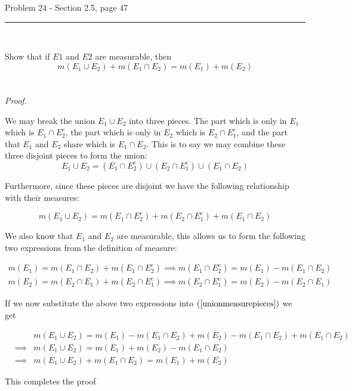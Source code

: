 \documentclass[11pt,reqno]{article}
\begin{document}
\begin{flushleft} 
Problem 24 - Section 2.5, page 47\\
\rule{500pt}{1pt}\\
\end{flushleft} 

Show that if $E1$ and $E2$ are measurable, then
\[ m(E_1 \cup E_2) + m(E_1 \cap E_2) = m(E_1) + m(E_2) \]
\\\\ \emph{Proof.}

We may break the union $E_1 \cup E_2$ into three pieces. The part which is only in $E_1$ which is $E_1 \cap E_2^c$, the part which is only in $E_2$ which is $E_2 \cap E_1^c$, and the part that $E_1$ and $E_2$ share which is $E_1 \cap E_2$. This is to say we may combine these three disjoint pieces to form the union:
\[ E_1 \cup E_2 = (E_1 \cap E_2^c) \cup  (E_2 \cap E_1^c) \cup (E_1 \cap E_2) \]

\noindent Furthermore, since these pieces are disjoint we have the following relationship with their measures:

\begin{equation} 
m(E_1 \cup E_2) = m(E_1 \cap E_2^c) +  m(E_2 \cap E_1^c) + m(E_1 \cap E_2) \label{unionmeasurepieces} 
\end{equation}

We also know that $E_1$ and $E_2$ are measurable, this allows us to form the following two expressions from the definition of measure:

\begin{eqnarray*}
m(E_1) =  m(E_1 \cap E_2) + m(E_1 \cap E_2^c) \implies  m(E_1 \cap E_2^c) =  m(E_1) - m(E_1 \cap E_2) \\
m(E_2) =  m(E_2 \cap E_1) + m(E_2 \cap E_1^c) \implies m(E_2 \cap E_1^c) = m(E_2) - m(E_2 \cap E_1)
\end{eqnarray*}

\noindent If we now substitute the above two expressions into $(\ref{unionmeasurepieces})$ we get

\begin{eqnarray*} 
&&m(E_1 \cup E_2)  = m(E_1) - m(E_1 \cap E_2) + m(E_2) - m(E_1 \cap E_2) +  m(E_1 \cap E_2) \\
&\implies& m(E_1 \cup E_2)  = m(E_1) + m(E_2) -  m(E_1 \cap E_2) \\
&\implies& m(E_1 \cup E_2) + m(E_1 \cap E_2)  = m(E_1) + m(E_2) 
\end{eqnarray*}

\noindent This completes the proof
\end{document}

